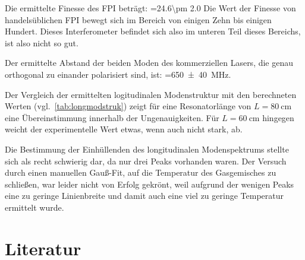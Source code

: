 \documentclass[slug=GL, room=HZDR\ Dresden/Rossendorf\,\ Geb.\ 620/123, supervisor=Tim\ Ziegler]{../../Lab_Report_LaTeX/lab_report}
\begin{document}
Die ermittelte Finesse des FPI beträgt: =\SI{24.6\pm
2.0}{} Die Wert der Finesse von handelsüblichen FPI bewegt sich im
Bereich von einigen Zehn bis einigen Hundert. Dieses Interferometer
befindet sich also im unteren Teil dieses Bereichs, ist also nicht so
gut.

Der ermittelte Abstand der beiden Moden des kommerziellen Lasers, die
genau orthogonal zu einander polarisiert sind, ist:
=\SI{650\pm 40}{\mega\hertz}.

Der Vergleich der ermittelten logitudinalen Modenstruktur mit den
berechneten Werten (vgl.~\ref{tab:longmodstruk}) zeigt für eine
Resonatorlänge von \(L=\SI{80}{\centi\meter}\) eine Übereinstimmung
innerhalb der Ungenauigkeiten.  Für \(L=\SI{60}{\centi\meter}\)
hingegen weicht der experimentelle Wert etwas, wenn auch nicht stark,
ab.

Die Bestimmung der Einhüllenden des longitudinalen Modenspektrums
stellte sich als recht schwierig dar, da nur drei Peaks vorhanden
waren. Der Versuch durch einen manuellen Gauß-Fit, auf die Temperatur
des Gasgemisches zu schließen, war leider nicht von Erfolg gekrönt,
weil aufgrund der wenigen Peaks eine zu geringe Linienbreite und damit
auch eine viel zu geringe Temperatur ermittelt wurde.


\section{Literatur}
\label{sec:literatur}

\printbibliography
\end{document}
